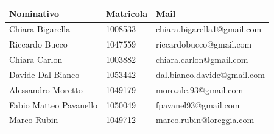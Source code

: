 	\begin{center}
	\begin{tabu} to \textwidth {|X[4]|X[2c]|X[5]|}
	\hline
     Nominativo & Matricola & Mail \\ \hline
     Chiara Bigarella & 1008533 & chiara.bigarella1@gmail.com \\ \hline
     Riccardo Bucco & 1047559 & riccardobucco@gmail.com \\ \hline
     Chiara Carlon & 1003882 & chiara.carlon@gmail.com \\ \hline
     Davide Dal Bianco & 1053442 & dal.bianco.davide@gmail.com \\ \hline
     Alessandro Moretto & 1049179 & moro.ale.93@gmail.com \\ \hline
     Fabio Matteo Pavanello & 1050049 & fpavanel93@gmail.com \\ \hline
     Marco Rubin & 1049712 & marco.rubin@loreggia.com \\ \hline
     \end{tabu}
	\end{center}
